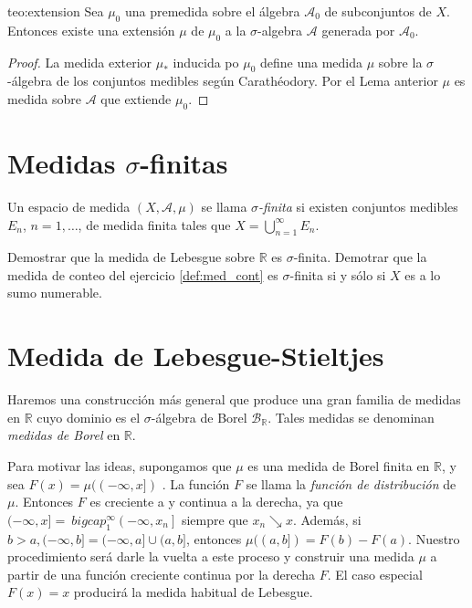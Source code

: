  
\begin{teorema}{teo:extension}
  Sea $\mu_0$ una premedida sobre el álgebra  $\mathscr{A}_0$ de subconjuntos de $X$. Entonces existe una extensión $\mu$ de $\mu_0$ a la $\sigma$-algebra   $\mathscr{A}$ generada por  $\mathscr{A}_0$.
\end{teorema}
\begin{proof}  La medida exterior $\mu_{*}$ inducida po $\mu_{0}$ define una medida $\mu$ sobre la $\sigma$-álgebra de los conjuntos medibles según  Carathéodory. Por el Lema anterior  $\mu$ es medida sobre $\mathscr{A}$ que extiende $\mu_{0}$. 

\end{proof}



\section{Medidas $\sigma$-finitas}

\begin{definicion}{} Un espacio de medida $(X,\mathcal{A},\mu)$ se llama \emph{$\sigma$-finita}  si existen conjuntos medibles $E_n$, $n=1,\ldots$, de medida finita tales que $X=\bigcup_{n=1}^{\infty}E_n$. 
 
\end{definicion}

\begin{ejercicio}{}
 Demostrar que la medida de Lebesgue sobre $\mathbb{R}$ es $\sigma$-finita. Demotrar que la medida de conteo del ejercicio \ref{def:med_cont}  es $\sigma$-finita si y sólo si $X$ es a lo sumo numerable.
\end{ejercicio}


\section{Medida de Lebesgue-Stieltjes}

Haremos una construcción más general  que produce una gran familia de medidas en $\mathbb{R}$ cuyo dominio es el $\sigma$-álgebra de Borel $\mathcal{B}_{\mathbb {R}}$. Tales medidas se denominan \emph{medidas de Borel} en $\mathbb{R}$.

Para motivar las ideas, supongamos que $\mu$ es una medida de Borel finita en $\mathbb{R}$, y sea $F(x)=\mu((-\infty, x])$ . La función $F$  se llama la \emph{función de distribución} de $\mu$.  Entonces $F$ es creciente a y continua a la derecha, ya que $(-\infty, x]=\ bigcap_{1}^{\infty}\left(-\infty, x_{n}\right]$ siempre que $x_{n} \searrow x$.  Además, si $b>a,(-\infty, b]=(-\infty, a] \cup(a, b]$, entonces $\mu((a, b])=F(b) -F(a)$. Nuestro procedimiento será darle la vuelta a este proceso y construir una medida $\mu$ a partir de una función creciente continua por la derecha $F$. El caso especial $F(x)=x$ producirá la medida habitual de Lebesgue.

